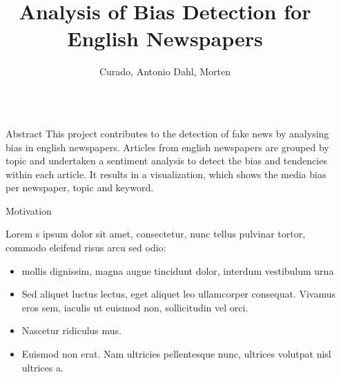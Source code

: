 \documentclass[final,8pt]{beamer} %
\title{Analysis of Bias Detection for English Newspapers {\emoji[ios]{1F4F0}}} %
\author{Curado, Antonio  {\emoji[ios]{1F9E0}}  Dahl, Morten} %
\institute{Masters in Advanced Analytics @ Nova IMS} %
\newlength{\sepwid}
\newlength{\onecolwid}
\begin{document}

\setlength{\belowcaptionskip}{2ex} %
\setlength\belowdisplayshortskip{2ex} %

\begin{frame}[t] %

\begin{columns}[t] %

\begin{column}{\sepwid}\end{column} %

\begin{column}{\onecolwid} %



\begin{block}{Abstract}
This project contributes to the detection of fake news by analysing bias in english newspapers. Articles from english newspapers are grouped by topic and undertaken a sentiment analysis to detect  the bias and tendencies within each article. It results in a visualization, which shows the media bias per newspaper, topic and keyword.

\end{block}



\begin{block}{Motivation {}}

    Lorem s ipsum dolor sit amet, consectetur, nunc tellus pulvinar tortor, commodo eleifend risus arcu sed odio:
    \begin{itemize}
        \item mollis dignissim, magna augue tincidunt dolor, interdum vestibulum urna
        \item Sed aliquet luctus lectus, eget aliquet leo ullamcorper consequat. Vivamus eros sem, iaculis ut euismod non, sollicitudin vel orci.
        \item Nascetur ridiculus mus.  
        \item Euismod non erat. Nam ultricies pellentesque nunc, ultrices volutpat nisl ultrices a.
    \end{itemize}


\end{block}
\end{column}
\end{columns}
\end{frame}
\end{document}
